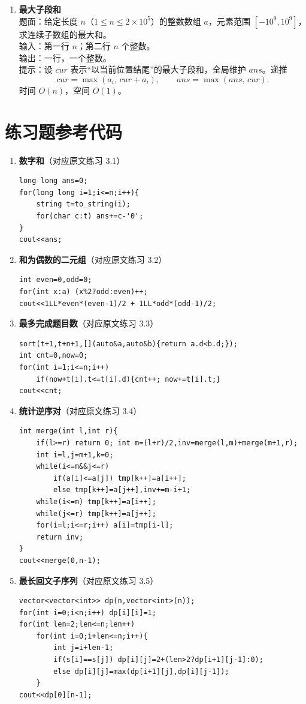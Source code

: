 \documentclass{article}
\begin{document}
\begin{enumerate}[label=\textbf{DP\arabic*.}]
  \item \textbf{最大子段和}\\
    题面：给定长度 $n$（$1\le n\le 2\times10^5$）的整数数组 $a$，元素范围 $[-10^9,10^9]$，求连续子数组的最大和。\\
    输入：第一行 $n$；第二行 $n$ 个整数。\\
    输出：一行，一个整数。\\
    提示：设 $cur$ 表示“以当前位置结尾”的最大子段和，全局维护 $ans$。递推
    $$cur=\max(a_i,\,cur+a_i),\qquad ans=\max(ans,\,cur).$$
    时间 $O(n)$，空间 $O(1)$。
\end{enumerate}

\section{练习题参考代码}

\begin{enumerate}[label=\textbf{练习\arabic*.}]
  \item \textbf{数字和}（对应原文练习 3.1）
\begin{lstlisting}
long long ans=0;
for(long long i=1;i<=n;i++){
    string t=to_string(i);
    for(char c:t) ans+=c-'0';
}
cout<<ans;
\end{lstlisting}

  \item \textbf{和为偶数的二元组}（对应原文练习 3.2）
\begin{lstlisting}
int even=0,odd=0;
for(int x:a) (x%2?odd:even)++;
cout<<1LL*even*(even-1)/2 + 1LL*odd*(odd-1)/2;
\end{lstlisting}

  \item \textbf{最多完成题目数}（对应原文练习 3.3）
\begin{lstlisting}
sort(t+1,t+n+1,[](auto&a,auto&b){return a.d<b.d;});
int cnt=0,now=0;
for(int i=1;i<=n;i++)
    if(now+t[i].t<=t[i].d){cnt++; now+=t[i].t;}
cout<<cnt;
\end{lstlisting}

  \item \textbf{统计逆序对}（对应原文练习 3.4）
\begin{lstlisting}
int merge(int l,int r){
    if(l>=r) return 0; int m=(l+r)/2,inv=merge(l,m)+merge(m+1,r);
    int i=l,j=m+1,k=0;
    while(i<=m&&j<=r)
        if(a[i]<=a[j]) tmp[k++]=a[i++];
        else tmp[k++]=a[j++],inv+=m-i+1;
    while(i<=m) tmp[k++]=a[i++];
    while(j<=r) tmp[k++]=a[j++];
    for(i=l;i<=r;i++) a[i]=tmp[i-l];
    return inv;
}
cout<<merge(0,n-1);
\end{lstlisting}

  \item \textbf{最长回文子序列}（对应原文练习 3.5）
\begin{lstlisting}
vector<vector<int>> dp(n,vector<int>(n));
for(int i=0;i<n;i++) dp[i][i]=1;
for(int len=2;len<=n;len++)
    for(int i=0;i+len<=n;i++){
        int j=i+len-1;
        if(s[i]==s[j]) dp[i][j]=2+(len>2?dp[i+1][j-1]:0);
        else dp[i][j]=max(dp[i+1][j],dp[i][j-1]);
    }
cout<<dp[0][n-1];
\end{lstlisting}
\end{enumerate}
\end{document}
